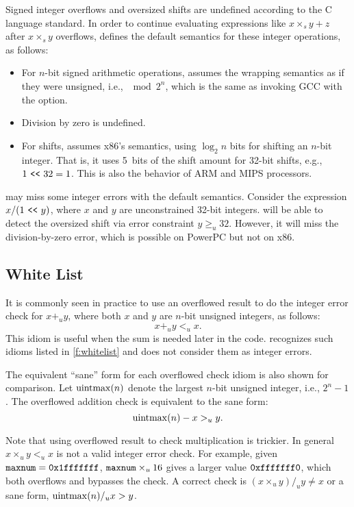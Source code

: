Signed integer overflows and oversized shifts are undefined according
to the C language standard.  In order to continue evaluating
expressions like $x \times_s y + z$ after $x \times_s y$ overflows,
\sys defines the default semantics for these integer operations, as
follows:
\begin{itemize}
\item
For $n$-bit signed arithmetic operations, \sys assumes the wrapping
semantics as if they were unsigned, i.e., $\mod{2^n}$, which is
the same as invoking GCC with the  option.
\item
Division by zero is undefined.
\item
For shifts, \sys assumes x86's semantics, using $\log_2 n$ bits for
shifting an $n$-bit integer.  That is, it uses 5~bits of the shift
amount for 32-bit shifts, e.g., $1 \ \texttt{<}\texttt{<}\  32 = 1$.  This is also the
behavior of ARM and MIPS processors.
\end{itemize}
\sys may miss some integer errors with the default semantics.
Consider the expression $x / (1 \ \texttt{<}\texttt{<}\  y)$, where $x$ and $y$ are
unconstrained 32-bit integers.  \sys will be able to detect the
oversized shift via error constraint $y \geq_u 32$.  However, it
will miss the division-by-zero error, which is possible on PowerPC
but not on x86.

\subsection{White List}
\label{s:sema:whitelist}

It is commonly seen in practice to use an overflowed result to do
the integer error check for $x +_u y$, where both $x$ and $y$ are
$n$-bit unsigned integers, as follows:
\begin{equation*}
x +_u y <_u x.
\end{equation*}
This idiom is useful when the sum is needed later in the code.
\sys recognizes such idioms listed in \autoref{f:whitelist} and
does not consider them as integer errors.

The equivalent ``sane'' form for each overflowed check idiom is
also shown for comparison.  Let $\operatorname{uintmax}(n)$ denote the largest
$n$-bit unsigned integer, i.e., $2^n - 1$.  The overflowed addition
check is equivalent to the sane form:
\begin{equation*}
\operatorname{uintmax}(n) - x >_u y.
\end{equation*}

Note that using overflowed result to check multiplication is trickier.
In general $x \times_u y <_u x$ is not a valid integer error check.
For example, given $\texttt{maxnum} = \texttt{0x1fffffff}$, $\texttt{maxnum}
\times_u 16$ gives a larger value $\texttt{0xfffffff0}$, which both
overflows and bypasses the check.  A correct check is $(x \times_u
y) /_u y \neq x$ or a sane form, $\operatorname{uintmax}(n) /_u x > y$.

